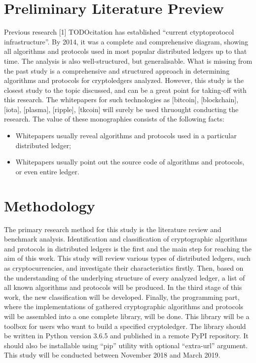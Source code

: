 \documentclass[12pt]{article}
\begin{document}
\section{Preliminary Literature Preview}
Previous research [1] TODOcitation has established ``current ctyptoprotocol
infrastructure''. By 2014, it was a complete and comprehensive diagram, showing
all algorithms and protocols used in most popular distributed ledgers up to
that time. The analysis is also well-structured, but generalisable. What is
missing from the past study is a comprehensive and structured approach
in determining algorithms and protocols for cryptoledgers analyzed. However,
this study is the closest study to the topic discussed, and can be a great
point for taking-off with this research. The whitepapers for such technologies
as [bitcoin], [blockchain], [iota], [plasma], [ripple], [tkcoin] will surely be
used thruought conducting the research. The value of these monographies
consists of the following facts:
\begin{itemize}
    \item Whitepapers usually reveal algorithms and protocols used in a
          particular distributed ledger;
    \item Whitepapers usually point out the source code of algorithms and
          protocols, or even entire ledger.
\end{itemize}

\section{Methodology}
The primary research method for this study is the literature review and
benchmark analysis. Identification and classification of cryptographic
algorithms and protocols in distributed ledgers is the first and the main step
for reaching the aim of this work. This study will  review various types of
distributed ledgers, such as cryptocurrencies, and investigate their
characteristics firstly. Then, based on the understanding of the underlying
structure of every analyzed ledger, a list of all known algorithms and
protocols will be produced. In the third stage of this work, the new
classification will be developed. Finally, the programming part, where the
implementations of gathered cryptographic algorithms and protocols will be
assembled into a one complete library, will be done. This library will be a
toolbox for users who want to build a specified cryptoledger. The library
should be written in Python version 3.6.5 and published in a remote PyPI
repository. It should also be installable using ``pip'' utility with optional
``extra-url'' argument. This study will be conducted between November 2018 and
March 2019.
\end{document}

